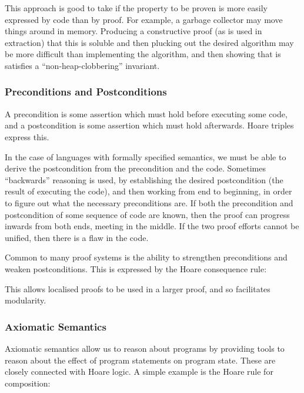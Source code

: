 This approach is good to take if the property to be proven is more
easily expressed by code than by proof. For example, a garbage
collector may move things around in memory. Producing a constructive
proof (as is used in extraction) that this is soluble and then
plucking out the desired algorithm may be more difficult than
implementing the algorithm, and then showing that is satisfies a
``non-heap-clobbering'' invariant.

\subsubsection{Preconditions and Postconditions}
\label{sec:lit-verification-embedding-conditions}

A precondition is some assertion which must hold before executing some
code, and a postcondition is some assertion which must hold
afterwards. Hoare triples express this.

In the case of languages with formally specified semantics, we must be
able to derive the postcondition from the precondition and the
code. Sometimes ``backwards'' reasoning is used, by establishing the
desired postcondition (the result of executing the code), and then
working from end to beginning, in order to figure out what the
necessary preconditions are. If both the precondition and
postcondition of some sequence of code are known, then the proof can
progress inwards from both ends, meeting in the middle. If the two
proof efforts cannot be unified, then there is a flaw in the code.

Common to many proof systems is the ability to strengthen
preconditions and weaken postconditions. This is expressed by the
Hoare consequence rule:

\begin{prooftree}
\end{prooftree}

This allows localised proofs to be used in a larger proof, and so
facilitates modularity.

\subsubsection{Axiomatic Semantics}
\label{sec:lit-verification-embedding-axioms}

Axiomatic semantics allow us to reason about programs by providing
tools to reason about the effect of program statements on program
state. These are closely connected with Hoare logic. A simple example
is the Hoare rule for composition:

